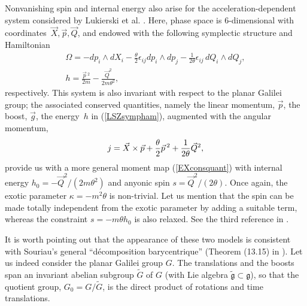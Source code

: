 \documentclass[a4paper,11pt]{article}
\def\vp{{\vec p}}
\def\vQ{{\vec Q}}
\def\vX{{\vec X}}
\newcommand{\fg}{\mathfrak{g}}
\begin{document}
 Nonvanishing spin and internal energy also arise for the
acceleration-dependent
system considered by Lukierski et al. \cite{LSZ}. Here, phase space is
$6$-dimensional with coordinates~$\vX, \vp,\vQ$, and
endowed with the following symplectic structure and Hamiltonian
\begin{equation}
\begin{array}{ll}
\Omega=-dp_i\wedge dX_i
-
\displaystyle\frac{\theta}{2}\epsilon_{ij}dp_i\wedge dp_j
-
\displaystyle\frac{1}{2\theta}\epsilon_{ij}\,dQ_i\wedge{}dQ_j,
\\[6pt]
h=\displaystyle\frac{\vp{\,}^2}{2m}-\displaystyle\frac{\vQ^2}{2m
\theta^2},
\end{array}
\label{LSZsympham}
\end{equation}
respectively. This system is also invariant with respect to the planar Galilei
group; the associated conserved quantities, namely the linear momentum, $\vp$,
the boost, $\vec{g}$,
the energy~$h$ in (\ref{LSZsympham}), augmented with the angular
momentum,
\begin{equation}
\begin{array}{ll}
j=\vX\times\vp+\displaystyle\frac{\theta}{2}\vp{\,}^2
+
\displaystyle\frac{1}{2\theta}\vQ^2,\hfill
\end{array}
\label{LSZconsquant}
\end{equation}
provide us with a  more general moment map
(\ref{EXconsquant})
with internal energy $h_{0}=-\vQ^2/(2m\theta^2)$ and anyonic
spin $s=\vQ^2/(2\theta)$.
 Once again,
the  exotic parameter $\kappa=-m^2\theta$ is non-trivial.
Let us mention that the spin  can
 be made totally independent from the exotic parameter
by adding a suitable term,
whereas the constraint $s=-m\theta h_{0}$
is also relaxed. See the third reference in \cite{LSZ}.
\goodbreak

It is worth pointing out that the appearance of these two models is
consistent with Souriau's  general  ``d\'ecomposition barycentrique''
(Theorem (13.15) in   \cite{SSD}). Let us indeed consider
the planar Galilei group $G$.
The translations and the boosts span an invariant abelian subgroup
$\widetilde{G}$ of  $G$ (with Lie algebra $\widetilde{\fg}\subset\fg$), so that
the quotient group, $G_{0}=G/\widetilde{G}$, is the direct product of rotations
and time translations.
\end{document}
